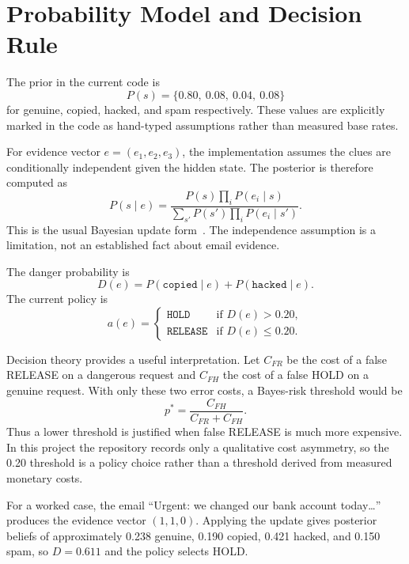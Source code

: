 \documentclass{article}
\begin{document}
\section{Probability Model and Decision Rule}

The prior in the current code is
\[
P(s) = \{0.80,\ 0.08,\ 0.04,\ 0.08\}
\]
for genuine, copied, hacked, and spam respectively. These values are explicitly marked in the code as hand-typed assumptions rather than measured base rates.

For evidence vector \(e = (e_1, e_2, e_3)\), the implementation assumes the clues are conditionally independent given the hidden state. The posterior is therefore computed as
\begin{equation}
P(s \mid e) = \frac{P(s) \prod_i P(e_i \mid s)}{\sum_{s'} P(s') \prod_i P(e_i \mid s')}.
\end{equation}
This is the usual Bayesian update form~\cite{berger1985}. The independence assumption is a limitation, not an established fact about email evidence.

The danger probability is
\begin{equation}
D(e) = P(\texttt{copied} \mid e) + P(\texttt{hacked} \mid e).
\end{equation}
The current policy is
\begin{equation}
a(e) =
\begin{cases}
\texttt{HOLD} & \text{if } D(e) > 0.20, \\
\texttt{RELEASE} & \text{if } D(e) \le 0.20.
\end{cases}
\end{equation}

Decision theory provides a useful interpretation. Let \(C_{FR}\) be the cost of a false RELEASE on a dangerous request and \(C_{FH}\) the cost of a false HOLD on a genuine request. With only these two error costs, a Bayes-risk threshold would be
\begin{equation}
p^* = \frac{C_{FH}}{C_{FR} + C_{FH}}.
\end{equation}
Thus a lower threshold is justified when false RELEASE is much more expensive. In this project the repository records only a qualitative cost asymmetry, so the 0.20 threshold is a policy choice rather than a threshold derived from measured monetary costs.

For a worked case, the email ``Urgent: we changed our bank account today\ldots'' produces the evidence vector \((1,1,0)\). Applying the update gives posterior beliefs of approximately 0.238 genuine, 0.190 copied, 0.421 hacked, and 0.150 spam, so \(D = 0.611\) and the policy selects HOLD.
\end{document}
